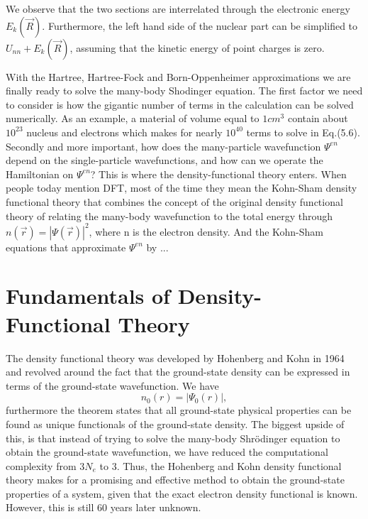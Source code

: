 We observe that the two sections are interrelated through the electronic energy $E_k(\vec{R})$. Furthermore, the left hand side of the nuclear part can be simplified to $U_{nn} + E_k(\vec{R})$, assuming that the kinetic energy of point charges is zero.

With the Hartree, Hartree-Fock and Born-Oppenheimer approximations we are finally ready to solve the many-body Shodinger equation. The first factor we need to consider is how the gigantic number of terms in the calculation can be solved numerically. As an example, a material of volume equal to $1cm^3$ contain about $10^{23}$ nucleus and electrons which makes for nearly $10^{40}$ terms to solve in Eq.(5.6). Secondly and more important, how does the many-particle wavefunction $\Psi^{en}$ depend on the single-particle wavefunctions, and how can we operate the Hamiltonian on $\Psi^{en}$? This is where the density-functional theory enters. When people today mention DFT, most of the time they mean the Kohn-Sham density functional theory that combines the concept of the original density functional theory of relating the many-body wavefunction to the total energy through $n(\vec{r}) = |\Psi(\vec{r})|^2$, where n is the electron density. And the Kohn-Sham equations that approximate $\Psi^{en}$ by ...

\section{Fundamentals of Density-Functional Theory}
The density functional theory was developed by Hohenberg and Kohn in 1964 and revolved around the fact that the ground-state density can be expressed in terms of the ground-state wavefunction. We have
\begin{equation}
    n_0(r) = |\Psi_0(r)|,
\end{equation}
furthermore the theorem states that all ground-state physical properties can be found as unique functionals of the ground-state density. The biggest upside of this, is that instead of trying to solve the many-body Shr\"{o}dinger equation to obtain the ground-state wavefunction, we have reduced the computational complexity from $3N_e$ to $3$. Thus, the Hohenberg and Kohn density functional theory makes for a promising and effective method to obtain the ground-state properties of a system, given that the exact electron density functional is known. However, this is still 60 years later unknown. 

